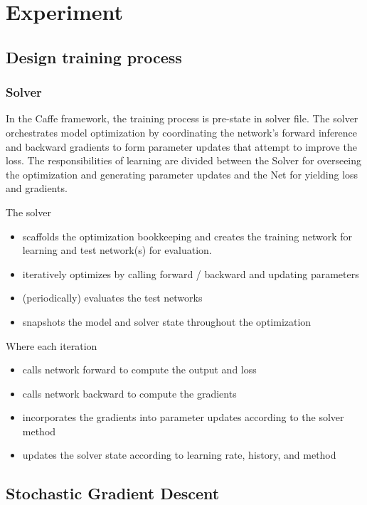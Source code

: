 \documentclass[conference]{IEEEtran}
\begin{document}
\section{Experiment}

\subsection{Design training process}

\subsubsection{Solver}
In the Caffe framework, the training process is pre-state in solver file. The solver orchestrates model optimization by coordinating the network’s forward inference and backward gradients to form parameter updates that attempt to improve the loss. The responsibilities of learning are divided between the Solver for overseeing the optimization and generating parameter updates and the Net for yielding loss and gradients.\par


The solver
\begin{itemize}
	\item scaffolds the optimization bookkeeping and creates the training network for learning and test network(s) for evaluation.
	\item iteratively optimizes by calling forward / backward and updating parameters
	\item (periodically) evaluates the test networks
	\item snapshots the model and solver state throughout the optimization
\end{itemize}

Where each iteration
\begin{itemize}
	\item calls network forward to compute the output and loss
	\item calls network backward to compute the gradients
	\item incorporates the gradients into parameter updates according to the solver method
	\item updates the solver state according to learning rate, history, and method
\end{itemize}

\subsection{Stochastic Gradient Descent}
\end{document}

